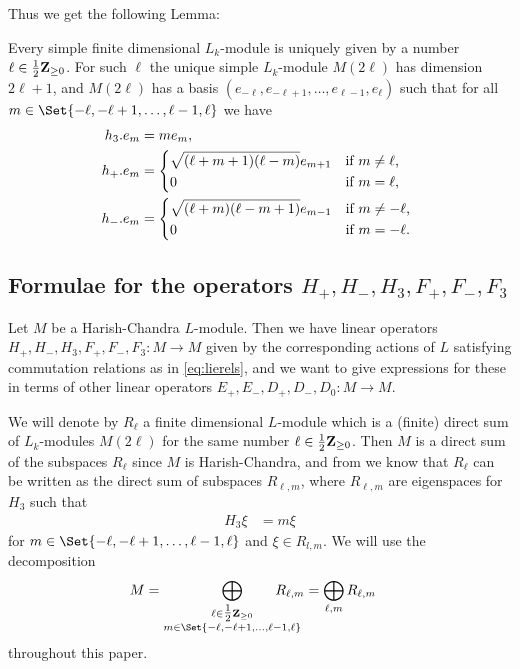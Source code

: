 Thus we get the following Lemma:
\begin{lemma}\label{lem:modulebasis}
  Every simple finite dimensional $L_k$-module is uniquely given by a number $\ell\in\tfrac{1}{2}\mathbf{Z}_{\geq 0}$. For such $\ell$ the unique simple $L_k$-module $M(2\ell)$ has dimension $2\ell+1$, and $M(2\ell)$ has a basis $(e_{-\ell},e_{-\ell+1},\dotsc,e_{\ell-1},e_\ell)$ such that for all $m\in\Set{-\ell,-\ell+1,\dotsc,\ell-1,\ell}$ we have
  \begin{align}
    \begin{split}
      h_3.e_m &= me_m,\label{eq:modulerels} \\
      h_+.e_m &=
      \begin{dcases*}
        \sqrt{(\ell+m+1)(\ell-m)}e_{m+1} & if $m\neq \ell$, \\
        0 & if $m=\ell$,
      \end{dcases*} \\
      h_-.e_m &=
      \begin{dcases*}
        \sqrt{(\ell+m)(\ell-m+1)}e_{m-1} & if $m\neq -\ell$, \\
        0 & if $m=-\ell$.
      \end{dcases*}
    \end{split}
  \end{align}
\end{lemma}

\subsection{Formulae for the operators \texorpdfstring{$H_+,H_-,H_3,F_+,F_-,F_3$}{H\_+,H\_-,H\_3,F\_+,F\_-,F\_3}}\label{sec:formulae}

Let $M$ be a Harish-Chandra $L$-module. Then we have linear operators $H_+, H_-, H_3, F_+, F_-, F_3\colon M\to M$ given by the corresponding actions of $L$ satisfying commutation relations as in \cref{eq:lierels}, and we want to give expressions for these in terms of other linear operators $E_+,E_-,D_+,D_-,D_0\colon M\to M$. 

We will denote by $R_\ell$ a finite dimensional $L$-module which is a (finite) direct sum of $L_k$-modules $M(2\ell)$ for the same number $\ell\in\tfrac{1}{2}\mathbf{Z}_{\geq 0}$. Then $M$ is a direct sum of the subspaces $R_\ell$ since $M$ is Harish-Chandra, and from  we know that $R_\ell$ can be written as the direct sum of subspaces $R_{\ell,m}$, where $R_{\ell,m}$ are eigenspaces for $H_3$ such that
\begin{align} \label{eq:H3eigen}
  H_3\xi &= m\xi
\end{align}
for $m\in\Set{-\ell,-\ell+1,\dotsc,\ell-1,\ell}$ and $\xi\in R_{l,m}$. We will use the decomposition
\begin{align*}
  M &= \bigoplus_{\substack{\ell\in\tfrac{1}{2}\Z_{\geq 0} \\ m\in\Set{-\ell,-\ell+1,\dotsc,\ell-1,\ell}}} \!\!\!\!\!\!\!\!\!\!\!\! R_{\ell,m} = \bigoplus_{\ell,m} R_{\ell,m}
\end{align*}
throughout this paper.

